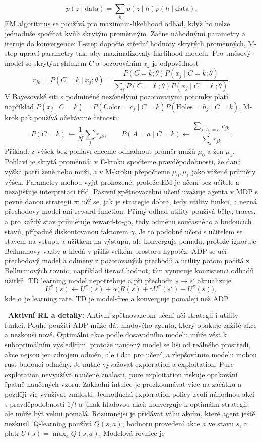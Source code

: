 \begin{odpoved}
\[
p(z\mid\mathrm{data})=\sum_h p(z\mid h)p(h\mid\mathrm{data}).
\]
EM algoritmus se používá pro maximum-likelihood odhad, když ho nelze jednoduše spočítat kvůli skrytým proměnným. Začne náhodnými parametry a iteruje do konvergence: E-step dopočte střední hodnoty skrytých proměnných, M-step upraví parametry tak, aby maximalizovaly likelihood modelu. Pro směsový model se skrytým shlukem $C$ a pozorováním $x_j$ je odpovědnost
\[
r_{jk}=P(C=k\mid x_j;\theta)=
\frac{P(C=k;\theta)P(x_j\mid C=k;\theta)}
{\sum_\ell P(C=\ell;\theta)P(x_j\mid C=\ell;\theta)}.
\]
V Bayesovské síti s podmíněně nezávislými pozorovanými potomky platí například
$P(x_j\mid C=k)=P(\mathrm{Color}=c_j\mid C=k)P(\mathrm{Holes}=h_j\mid C=k)$.
M-krok pak používá očekávané četnosti:
\[
P(C=k)\leftarrow\frac1N\sum_j r_{jk},\qquad
P(A=a\mid C=k)\leftarrow
\frac{\sum_{j:A_j=a} r_{jk}}{\sum_j r_{jk}}.
\]
Příklad: z výšek bez pohlaví chceme odhadnout průměr mužů $\mu_0$ a žen $\mu_1$. Pohlaví je skrytá proměnná; v E-kroku spočteme pravděpodobnosti, že daná výška patří ženě nebo muži, a v M-kroku přepočteme $\mu_0,\mu_1$ jako vážené průměry výšek. Parametry mohou vyjít prohozené, protože EM je učení bez učitele a nezajišťuje interpretaci tříd. Pasivní zpětnovazební učení uvažuje agenta v MDP s pevně danou strategií $\pi$; učí se, jak je strategie dobrá, tedy utility funkci, a nezná přechodový model ani reward function. Přímý odhad utility používá běhy, traces, a pro každý stav průměruje reward-to-go, tedy odměnu současného a budoucích stavů, případně diskontovanou faktorem $\gamma$. Je to podobné učení s učitelem se stavem na vstupu a užitkem na výstupu, ale konverguje pomalu, protože ignoruje Bellmanovy vazby a hledá v příliš velkém prostoru hypotéz. ADP se učí přechodový model a odměny z pozorovaných přechodů a utility potom počítá z Bellmanových rovnic, například iterací hodnot; tím vynucuje konzistenci odhadů užitků. TD learning model nepotřebuje a při přechodu $s\to s'$ aktualizuje
\[
U^\pi(s)\leftarrow U^\pi(s)+\alpha\bigl(R(s)+\gamma U^\pi(s')-U^\pi(s)\bigr),
\]
kde $\alpha$ je learning rate. TD je model-free a konverguje pomaleji než ADP.\par
\noindent{}\ \textbf{Aktivní RL a detaily:} Aktivní zpětnovazební učení učí strategii i utility funkci. Pouhé použití ADP může dát hladového agenta, který opakuje zažité akce a nezkouší nové. Optimální akce podle dosavadního modelu může vést k suboptimálním výsledkům, protože naučený model se liší od reálného prostředí, akce nejsou jen zdrojem odměn, ale i dat pro učení, a zlepšováním modelu mohou růst budoucí odměny. Je nutné vyvažovat exploration a exploitation. Pure exploration nevyužívá naučené znalosti, pure exploitation riskuje opakování špatně naučených vzorů. Základní intuice je prozkoumávat více na začátku a později víc využívat znalosti. Jednoduchá exploration policy zvolí náhodnou akci s pravděpodobností $1/t$ a jinak hladovou akci; konverguje k optimální strategii, ale může být velmi pomalá. Rozumnější je přidávat váhu akcím, které agent ještě nezkusil. Q-learning používá $Q(s,a)$, hodnotu provedení akce $a$ ve stavu $s$, a platí $U(s)=\max_a Q(s,a)$. Modelová rovnice je

\end{odpoved}
